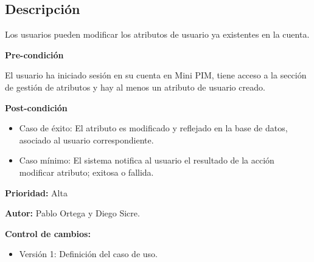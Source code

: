 
\subsection*{Descripción}
Los usuarios pueden modificar los atributos de usuario ya existentes en la cuenta.
\vspace{0.15cm}

\textbf{Pre-condición}\par
El usuario ha iniciado sesión en su cuenta en Mini PIM, tiene acceso a la sección de gestión de atributos y hay al menos un atributo de usuario creado.\par
\vspace{0.15cm}

\textbf{Post-condición}
\begin{itemize}
    \item Caso de éxito: El atributo es modificado y reflejado en la base de datos, asociado al usuario correspondiente.
    \item Caso mínimo: El sistema notifica al usuario el resultado de la acción modificar atributo; exitosa o fallida.
\end{itemize}

\textbf{Prioridad: }
Alta
\vspace{0.15cm}

\textbf{Autor: }
Pablo Ortega y Diego Sicre.\par
\vspace{0.15cm}

\textbf{Control de cambios: }
\begin{itemize}
    \item Versión 1: Definición del caso de uso.
\end{itemize}

